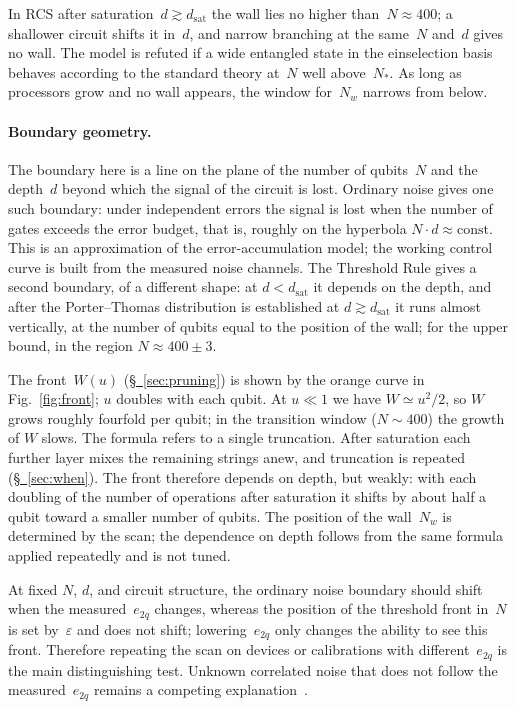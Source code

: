 \documentclass[11pt,a4paper]{article}
\newcommand{\CollapseRule}{Threshold Rule}
\begin{document}
In RCS after saturation~$d\gtrsim d_{\mathrm{sat}}$ the wall lies no higher than~$N\approx400$; a shallower circuit shifts it in~$d$, and narrow branching at the same~$N$ and~$d$ gives no wall. The model is refuted if a wide entangled state in the einselection basis behaves according to the standard theory at~$N$ well above~$N_*$. As long as processors grow and no wall appears, the window for~$N_w$ narrows from below.

\paragraph{Boundary geometry.}
The boundary here is a line on the plane of the number of qubits~$N$ and the depth~$d$ beyond which the signal of the circuit is lost. Ordinary noise gives one such boundary: under independent errors the signal is lost when the number of gates exceeds the error budget, that is, roughly on the hyperbola $N\cdot d\approx\mathrm{const}$. This is an approximation of the error-accumulation model; the working control curve is built from the measured noise channels. The \CollapseRule{} gives a second boundary, of a different shape: at $d<d_{\mathrm{sat}}$ it depends on the depth, and after the Porter--Thomas distribution is established at $d\gtrsim d_{\mathrm{sat}}$ it runs almost vertically, at the number of qubits equal to the position of the wall; for the upper bound, in the region $N\approx400\pm3$.

The front~$W(u)$ (\hyperref[sec:pruning]{\S~\ref*{sec:pruning}}) is shown by the orange curve in Fig.~\ref{fig:front}; $u$ doubles with each qubit. At $u\ll1$ we have $W\simeq u^2/2$, so $W$ grows roughly fourfold per qubit; in the transition window ($N\sim400$) the growth of $W$ slows. The formula refers to a single truncation. After saturation each further layer mixes the remaining strings anew, and truncation is repeated (\hyperref[sec:when]{\S~\ref*{sec:when}}). The front therefore depends on depth, but weakly: with each doubling of the number of operations after saturation it shifts by about half a qubit toward a smaller number of qubits. The position of the wall~$N_w$ is determined by the scan; the dependence on depth follows from the same formula applied repeatedly and is not tuned.

At fixed $N$, $d$, and circuit structure, the ordinary noise boundary should shift when the measured~$e_{2q}$ changes, whereas the position of the threshold front in~$N$ is set by~$\varepsilon$ and does not shift; lowering~$e_{2q}$ only changes the ability to see this front. Therefore repeating the scan on devices or calibrations with different~$e_{2q}$ is the main distinguishing test. Unknown correlated noise that does not follow the measured~$e_{2q}$ remains a competing explanation~\cite{kalai2016,rinott2022}.
\end{document}
